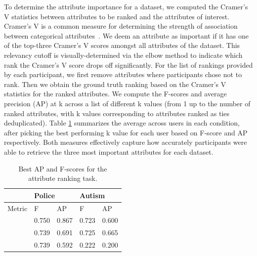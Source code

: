 To determine the attribute importance for a dataset, we computed the Cramer's V statistics between attributes to be ranked and the attributes of interest. Cramer's V is a common measure for determining the strength of association between categorical attributes~\cite{McHugh2013}. We deem an attribute as important if it has one of the top-three Cramer's V scores amongst all attributes of the dataset. This relevancy cutoff is visually-determined via the elbow method to indicate which rank the Cramer's V score drops off significantly. For the list of rankings provided by each participant, we first remove attributes where participants chose not to rank. Then we obtain the ground truth ranking based on the Cramer's V statistics for the ranked attributes. We compute the F-scores and average precision (AP) at k across a list of different k values (from 1 up to the number of ranked attributes, with k values corresponding to attributes ranked as ties deduplicated). Table \ref{table:ranking_results} summarizes the average across users in each condition, after picking the best performing k value for each user based on F-score and AP respectively. Both measures effectively capture how accurately participants were able to retrieve the three most important attributes for each dataset.
\begin{table}[ht!]
	\centering
	\begin{tabular}{|l|l|l|l|l|}
	\hline
	         & \multicolumn{2}{l|}{Police}                                   & \multicolumn{2}{l|}{Autism}                                   \\ \hline
	Metric   & F                             & AP                            & F                             & AP                            \\ \hline
	\system  & \cellcolor{blue!25}0.750 & \cellcolor{blue!25}0.867 & 0.723                         & 0.600                         \\ \hline
	\cluster & 0.739                         & 0.691                         & \cellcolor{blue!25}0.725 & \cellcolor{blue!25}0.665 \\ \hline
	\BFS     & 0.739                         & 0.592                         & 0.222                         & 0.200                         \\ \hline
	\end{tabular}
	\caption{Best AP and F-scores for the attribute ranking task.}
	\vspace{-10pt}
    \label{table:ranking_results}
\end{table}
